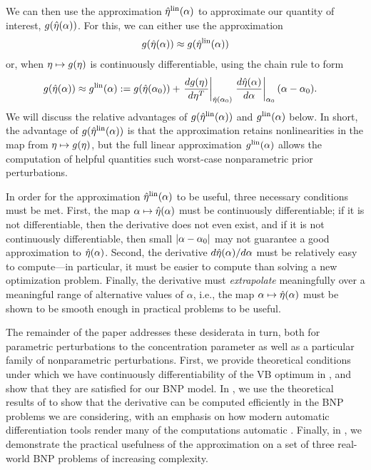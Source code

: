 We can then use the approximation $\hat\eta^{\mathrm{lin}}(\alpha)$ to approximate our quantity
of interest, $g(\hat\eta(\alpha))$.  For this, we can either use the
approximation
%
\begin{align*}
%
\g(\etaopt(\alpha)) \approx{} \g(\etalin(\alpha))
%
\end{align*}
%
or, when $\eta \mapsto g(\eta)$ is continuously differentiable, using the chain
rule to form
%
\begin{align*}
%
\g(\etaopt(\alpha)) \approx{}&
    \glin(\alpha) :=
        \g(\etaopt(\alpha_0)) +
            \fracat{d \g(\eta)}{ d\eta^T}{\etaopt(\alpha_0)}
            \fracat{d \etaopt(\alpha)}{d\alpha}{\alpha_0} (\alpha - \alpha_0).
%
\end{align*}
%
We will discuss the relative advantages of $g(\hat\eta^{\mathrm{lin}}(\alpha))$ and
$g^{\mathrm{lin}}(\alpha)$ below.  In short, the advantage of $g(\hat\eta^{\mathrm{lin}}(\alpha))$ is that
the approximation retains nonlinearities in the map from $\eta \mapsto
g(\eta)$, but the full linear approximation $g^{\mathrm{lin}}(\alpha)$ allows the
computation of helpful quantities such worst-case nonparametric prior
perturbations.

In order for the approximation $\hat\eta^{\mathrm{lin}}(\alpha)$ to be useful, three necessary
conditions must be met.  First, the map $\alpha \mapsto \hat\eta(\alpha)$ must be
continuously differentiable; if it is not differentiable, then the derivative
does not even exist, and if it is not continuously differentiable, then small
$\left|\alpha - \alpha_0\right|$ may not guarantee a good approximation to
$\hat\eta(\alpha)$. Second, the derivative $d \hat\eta(\alpha) / d\alpha$ must be
relatively easy to compute---in particular, it must be easier to compute than
solving a new optimization problem.  Finally, the derivative must {\em
extrapolate} meaningfully over a meaningful range of alternative values of
$\alpha$, i.e., the map $\alpha \mapsto \hat\eta(\alpha)$ must be shown to be
smooth enough in practical problems to be useful.

The remainder of the paper addresses these desiderata in turn, both for
parametric perturbations to the concentration parameter as well as a particular
family of nonparametric perturbations.  First, we provide theoretical conditions
under which we have continuously differentiability of the VB optimum in
, and show that they are satisfied for our BNP model.
In , we use the theoretical results of
 to show that the derivative can be computed
efficiently in the BNP problems we are considering, with an emphasis on how
modern automatic differentiation tools render many of the computations automatic
\citep{jax2018github}.  Finally, in , we demonstrate the
practical usefulness of the approximation on a set of three real-world BNP
problems of increasing complexity.


